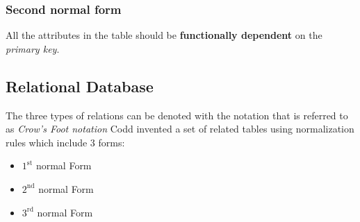 \documentclass{article}
\begin{document}
\subsubsection{Second normal form}
All the attributes in the table should be \textbf{functionally dependent} on the \emph{primary key}.

	
	\subsection{Relational Database}
	The three types of relations can be denoted with the notation that is referred to as \textit{Crow's Foot notation}
		Codd invented a set of related tables using normalization rules which include 3 forms:
		\begin{itemize}
			\item {$1^{\text{st}}$ normal Form}
			\item {$2^{\text{nd}}$ normal Form}
			\item {$3^{\text{rd}}$ normal Form}
		\end{itemize}
\end{document}
